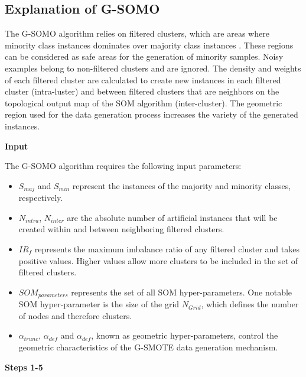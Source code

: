 \documentclass[parskip=full]{scrartcl}
\begin{document}
\subsection{Explanation of G-SOMO}

The G-SOMO algorithm relies on filtered clusters, which are areas where minority class instances dominates over majority class instances . These regions can be considered as safe areas for the generation of minority samples. Noisy examples belong to non-filtered clusters and are ignored. The density and weights of each filtered cluster are calculated to create new instances in each filtered cluster (intra-luster) and between filtered clusters that are neighbors on the topological output map of the SOM algorithm
(inter-cluster). The geometric region used for the data generation process increases the variety of the generated instances.

\textbf{Input}

The G-SOMO algorithm requires the following input parameters:

\begin{itemize}

	\renewcommand\labelitemi{--}

	\item $S_{maj}$ and $S_{min}$ represent the instances of the majority and minority classes, respectively.

	\item $N_{intra}$, $N_{inter}$ are the absolute number of artificial instances that will be created within and between neighboring filtered clusters.

	\item $IR_{f}$ represents the maximum imbalance ratio of any filtered cluster and takes positive values. Higher values allow more clusters to be included in the set of filtered clusters.

	\item $SOM_{parameters}$ represents the set of all SOM hyper-parameters. One notable SOM hyper-parameter is the size of the grid $N_{Grid}$, which defines the number of nodes and therefore clusters.

	\item $\alpha_{trunc}$, $\alpha_{def}$ and $\alpha_{def}$, known as geometric hyper-parameters, control the geometric characteristics of the G-SMOTE data generation mechanism.

\end{itemize}

\textbf{Steps 1-5}
\end{document}
